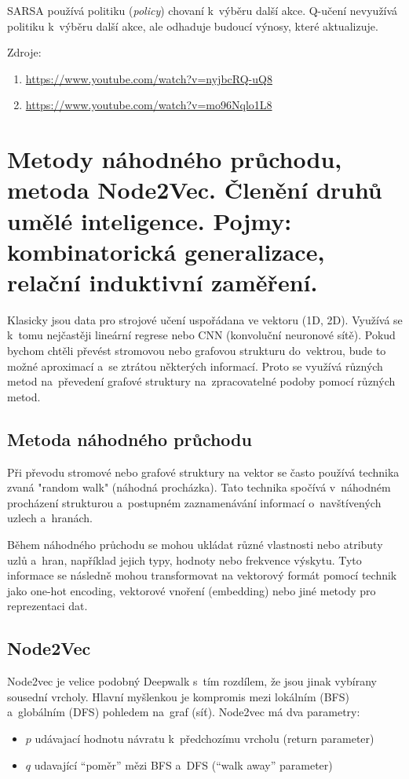 SARSA používá politiku (\emph{policy}) chovaní k~výběru další akce.
Q-učení nevyužívá politiku k~výběru další akce, ale odhaduje budoucí výnosy, které aktualizuje.

Zdroje:
\begin{enumerate}
    \item \url{https://www.youtube.com/watch?v=nyjbcRQ-uQ8}
    \item \url{https://www.youtube.com/watch?v=mo96Nqlo1L8}
\end{enumerate}

\clearpage
\section{Metody náhodného průchodu, metoda Node2Vec. Členění druhů umělé inteligence. Pojmy: kombinatorická generalizace, relační induktivní zaměření.}

Klasicky jsou data pro strojové učení uspořádana ve vektoru (1D, 2D).
Využívá se k~tomu nejčastěji lineární regrese nebo CNN (konvoluční neuronové sítě).
Pokud bychom chtěli převést stromovou nebo grafovou strukturu do~vektrou, bude to možné aproximací a~se ztrátou některých informací.
Proto se využívá různých metod na~převedení grafové struktury na~zpracovatelné podoby pomocí různých metod.


\subsection{Metoda náhodného průchodu}

Při převodu stromové nebo grafové struktury na vektor se často používá technika zvaná "random walk" (náhodná procházka). Tato technika spočívá v~náhodném procházení strukturou a~postupném zaznamenávání informací o~navštívených uzlech a~hranách.

Během náhodného průchodu se mohou ukládat různé vlastnosti nebo atributy uzlů a~hran, například jejich typy, hodnoty nebo frekvence výskytu. Tyto informace se následně mohou transformovat na vektorový formát pomocí technik jako one-hot encoding, vektorové vnoření (embedding) nebo jiné metody pro reprezentaci dat.

\subsection{Node2Vec}

Node2vec je velice podobný Deepwalk s~tím rozdílem, že jsou jinak vybírany sousední vrcholy.
Hlavní myšlenkou je kompromis mezi lokálním (BFS) a~globálním (DFS) pohledem na~graf (síť).
Node2vec má dva parametry:
\begin{itemize}
    \item $p$ udávajací hodnotu návratu k~předchozímu vrcholu (return parameter)
    \item $q$ udavající \enquote{poměr} mězi BFS a~DFS (\enquote{walk away} parameter)
\end{itemize}

